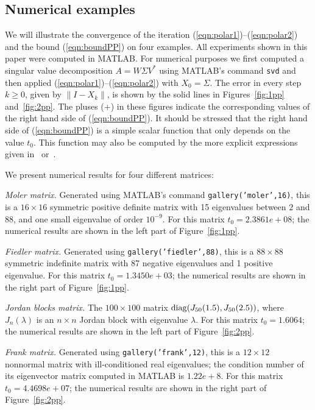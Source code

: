 \documentclass{siamltex}
\begin{document}
\subsection{Numerical examples}\label{sec:numerPP}

We will illustrate the convergence of the iteration (\ref{eqn:polar1})--(\ref{eqn:polar2})
and the bound (\ref{eqn:boundPP}) on four examples. All experiments shown in this paper
were computed in MATLAB. For numerical purposes we first computed a singular value
decomposition $A=W\Sigma V^*$ using MATLAB's command {\tt svd} and then applied
(\ref{eqn:polar1})--(\ref{eqn:polar2}) with $X_0=\Sigma$. The error in every step $k\geq 0$,
given by $\|I-X_k\|$, is shown by the solid lines in Figures~\ref{fig:1pp} and~\ref{fig:2pp}.
The pluses ($+$) in these figures indicate the corresponding values of the
right hand side of (\ref{eqn:boundPP}). It should be stressed that the right hand side of
(\ref{eqn:boundPP}) is a simple scalar function that only depends on the value $t_0$.
This function may also be computed by the more explicit expressions given in~\cite{PotPta80}
or~\cite[Chapter~5]{PotPtaBook84}.

We present numerical results for four different matrices:

\smallskip
{\em Moler matrix.\/}
Generated using MATLAB's command {\tt gallery('moler',16)}, this is a $16\times 16$ symmetric
positive definite matrix with 15 eigenvalues between $2$ and $88$,
and one small eigenvalue of order $10^{-9}$.
For this matrix $t_0=2.3861e+08$; the numerical results are shown in the left
part of Figure~\ref{fig:1pp}.

\smallskip
{\em Fiedler matrix.\/}
Generated using {\tt gallery('fiedler',88)}, this is a $88\times 88$ symmetric indefinite matrix
with 87 negative eigenvalues and 1 positive eigenvalue.
For this matrix $t_0=1.3450e+03$; the numerical results are shown in
the right part of Figure~\ref{fig:1pp}.

\smallskip
{\em Jordan blocks matrix.\/} The $100\times 100$ matrix ${\rm diag}(J_{50}(1.5),J_{50}(2.5))$,
where $J_n(\lambda)$ is an $n\times n$ Jordan block with eigenvalue $\lambda$.
For this matrix $t_0=1.6064$; the numerical results are shown in the left part of Figure~\ref{fig:2pp}.

\smallskip
{\em Frank matrix.\/} Generated using {\tt gallery('frank',12)}, this is a $12\times 12$
nonnormal matrix with ill-conditioned real eigenvalues; the condition number of its eigenvector
matrix computed in MATLAB is $1.22e+8$. For this matrix
$t_0=4.4698e+07$; the numerical results are shown in the right part of Figure~\ref{fig:2pp}.
\end{document}
